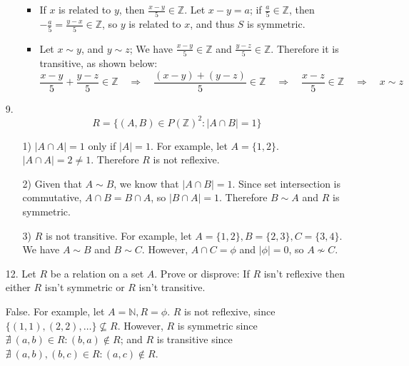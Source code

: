 \documentclass[fleqn]{article}
\begin{document}
\begin{enumerate}
\begin{enumerate}
\begin{itemize}
			\item
			If \(x\) is related to \(y\), then \(\frac{x - y}{5} \in \mathbb{Z}\). Let \(x - y = a\); if \(\frac{a}{5} \in \mathbb{Z}\), then \(-\frac{a}{5} = \frac{y - x}{5} \in \mathbb{Z}\), so \(y\) is related to \(x\), and thus \(S\) is symmetric.

			\item
			Let \(x \sim y\), and \(y \sim z\); We have \(\frac{x - y}{5} \in \mathbb{Z}\) and \(\frac{y - z}{5} \in \mathbb{Z}\). Therefore it is transitive, as shown below:
			\[\frac{x - y}{5} + \frac{y - z}{5} \in \mathbb{Z} \quad \Rightarrow \quad \frac{(x - y) + (y - z)}{5} \in \mathbb{Z} \quad \Rightarrow \quad \frac{x - z}{5} \in \mathbb{Z} \quad \Rightarrow \quad x \sim z\]
		\end{itemize}
	\end{enumerate}

	\item[9.]
	\[R = \{(A, B) \in P(\mathbb{Z})^{2} : | A \cap B | = 1\}\]
	\begin{enumerate}
		\item[1)]
		\(|A \cap A| = 1\) only if \(|A| = 1\). For example, let \(A = \{1, 2\}\). \(|A \cap A| = 2 \neq 1\). Therefore \(R\) is not reflexive.

		\item[2)]
		Given that \(A \sim B\), we know that \(|A \cap B| = 1\). Since set intersection is commutative, \(A \cap B = B \cap A\), so \(|B \cap A| = 1\). Therefore \(B \sim A\) and \(R\) is symmetric.

		\item[3)]
		\(R\) is not transitive. For example, let \(A = \{1, 2\}, B = \{2, 3\}, C = \{3, 4\}\). We have \(A \sim B\) and \(B \sim C\). However, \(A \cap C = \phi\) and \(|\phi| = 0\), so \(A \nsim C\).
	\end{enumerate}

	\item[12.]
	Let \(R\) be a relation on a set \(A\). Prove or disprove: If \(R\) isn’t reflexive then either \(R\) isn’t symmetric or \(R\) isn’t transitive.

	False. For example, let \(A = \mathbb{N}, R = \phi\). \(R\) is not reflexive, since \(\{(1, 1), (2, 2), \dots\} \nsubseteq R\). However, \(R\) is symmetric since \(\nexists \ (a, b) \in R : (b, a) \notin R\); and \(R\) is transitive since \(\nexists \ (a, b), (b, c) \in R : (a, c) \notin R\).
\end{enumerate}
\end{document}
